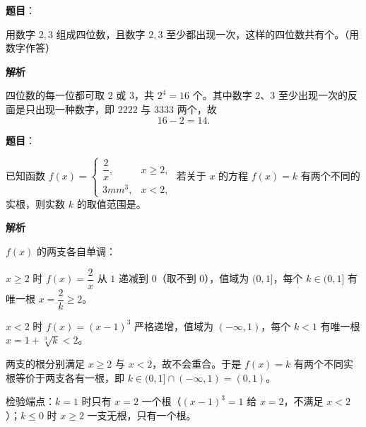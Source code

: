 \begin{answer}

\textbf{题目}：

用数字 $2,3$ 组成四位数，且数字 $2,3$ 至少都出现一次，这样的四位数共有\gkblank{}个。（用数字作答）

\textbf{解析}

四位数的每一位都可取 $2$ 或 $3$，共 $2^4=16$ 个。其中数字 $2$、$3$ 至少出现一次的反面是只出现一种数字，即 $2222$ 与 $3333$ 两个，故
\nopagebreak[4]
\[
16-2=14.
\]


\end{answer}
\begin{answer}

\textbf{题目}：

已知函数 $f(x)=\begin{cases}\dfrac2x,&x\geqslant 2,\\3mm^3,&x<2,\end{cases}$ 若关于 $x$ 的方程 $f(x)=k$ 有两个不同的实根，则实数 $k$ 的取值范围是\gkblank{}。

\textbf{解析}

$f(x)$ 的两支各自单调：

$x\geqslant2$ 时 $f(x)=\dfrac2x$ 从 $1$ 递减到 $0$（取不到 $0$），值域为 $(0,1]$，每个 $k\in(0,1]$ 有唯一根 $x=\dfrac2k\geqslant2$。

$x<2$ 时 $f(x)=(x-1)^3$ 严格递增，值域为 $(-\infty,1)$，每个 $k<1$ 有唯一根 $x=1+\sqrt[3]k<2$。

两支的根分别满足 $x\geqslant2$ 与 $x<2$，故不会重合。于是 $f(x)=k$ 有两个不同实根等价于两支各有一根，即 $k\in(0,1]\cap(-\infty,1)=(0,1)$。

检验端点：$k=1$ 时只有 $x=2$ 一个根（$(x-1)^3=1$ 给 $x=2$，不满足 $x<2$）；$k\leqslant0$ 时 $x\geqslant2$ 一支无根，只有一个根。


\end{answer}

